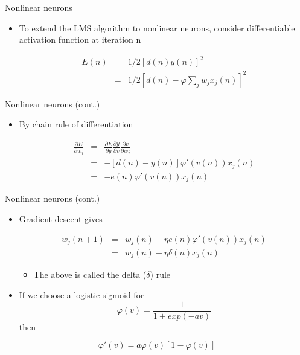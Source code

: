 \documentclass[notes]{beamer}
\providecommand{\tightlist}{%
  \setlength{\itemsep}{0pt}\setlength{\parskip}{0pt}}
\begin{document}
\begin{frame}{Nonlinear neurons}

\begin{itemize}
\tightlist
\item
  To extend the LMS algorithm to nonlinear neurons, consider
  differentiable activation function at iteration n

  \begin{eqnarray*}
         E (n) &=& 1/2 [d (n)  y (n)]^2 \\  
              &=& 1/2 \left[ d (n)  - \varphi  \sum_{j}  w_j x_j (n) \right] ^2  
  \end{eqnarray*}
\end{itemize}

\end{frame}

\begin{frame}{Nonlinear neurons (cont.)}

\begin{itemize}
\tightlist
\item
  By chain rule of differentiation

  \begin{eqnarray*}
  \frac{\partial E}{\partial w_j} &=&
   \frac{\partial E}{\partial y}\frac{\partial y}{\partial v}\frac{\partial v}{\partial w_j} \\ 
  &=& - [d (n) - y (n)]\varphi' (v(n) )x_ j (n) \\ 
  &=& - e(n) \varphi' (v(n) ) x_ j (n)
  \end{eqnarray*}
\end{itemize}

\end{frame}

\begin{frame}{Nonlinear neurons (cont.)}

\begin{itemize}
\tightlist
\item
  Gradient descent gives

  \begin{eqnarray*}
     w _j (n + 1) &=& w_ j (n) +\eta e(n)\varphi' (v(n)) x _j (n) \\ 
                       &=& w_ j (n) +\eta \delta (n) x_ j (n) 
     \end{eqnarray*}

  \begin{itemize}
  \tightlist
  \item
    The above is called the delta (\(\delta\)) rule
  \end{itemize}
\item
  If we choose a logistic sigmoid for
  \[                    \varphi (v) = \frac{1}{  1+ exp( - av )} \] then
\end{itemize}

\[                   \varphi '      ( v ) = a \varphi ( v )[1-\varphi   ( v )]   \]

\end{frame}
\end{document}
